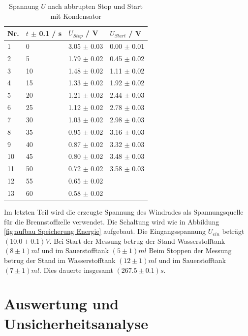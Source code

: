 \documentclass[12pt,a4paper,twoside]{article}
\begin{document}
\begin{table}[H]
    \centering
    \caption{Spannung $U$ nach abbrupten Stop und Start mit Kondensator}
    \label{tab:Messdaten Windkraft abbrupt stop kondensator}
    \begin{tabular}{| l | l | l | l |}
        \hline
        Nr. & $t$ $\pm $ 0.1 / s & $U_{Stop}$ / V & $U_{Start}$ / V \\
        \hline
        1  & 0  & 3.05 $\pm$ 0.03  & 0.00 $\pm$ 0.01  \\
        2  & 5  & 1.79 $\pm$ 0.02  & 0.45 $\pm$ 0.02  \\
        3  & 10 & 1.48 $\pm$ 0.02  & 1.11 $\pm$ 0.02  \\
        4  & 15 & 1.33 $\pm$ 0.02  & 1.92 $\pm$ 0.02  \\
        5  & 20 & 1.21 $\pm$ 0.02  & 2.44 $\pm$ 0.03  \\
        6  & 25 & 1.12 $\pm$ 0.02  & 2.78 $\pm$ 0.03  \\
        7  & 30 & 1.03 $\pm$ 0.02  & 2.98 $\pm$ 0.03  \\
        8  & 35 & 0.95 $\pm$ 0.02  & 3.16 $\pm$ 0.03  \\
        9  & 40 & 0.87 $\pm$ 0.02  & 3.32 $\pm$ 0.03  \\
        10 & 45 & 0.80 $\pm$ 0.02  & 3.48 $\pm$ 0.03  \\
        11 & 50 & 0.72 $\pm$ 0.02  & 3.58 $\pm$ 0.03  \\
        12 & 55 & 0.65 $\pm$ 0.02  &   \\
        13 & 60 & 0.58 $\pm$ 0.02  &   \\
        \hline  
    \end{tabular}
\end{table}

\noindent
Im letzten Teil wird die erzeugte Spannung des Windrades als Spannungsquelle für die Brennstoffzelle verwendet. 
Die Schaltung wird wie in Abbildung \ref{fig:aufbau Speicherung Energie} aufgebaut. 
Die Eingangsspannung $U_{ein}$ beträgt $(10.0 \pm 0.1)V$. Bei Start der Messung betrug der Stand Wasserstofftank $(8 \pm 1)ml$ und im Sauerstofftank $(5 \pm 1)ml$
Beim Stoppen der Messung betrug der Stand im Wasserstofftank $(12 \pm 1)ml$ und im Sauerstofftank $(7 \pm 1)ml$. Dies dauerte insgesamt $(267.5 \pm 0.1) s$. 


\section{Auswertung und Unsicherheitsanalyse} %
\end{document}
